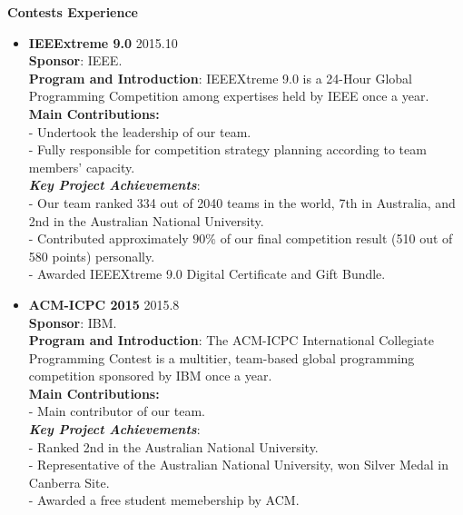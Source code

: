 \documentclass{res}
\newcommand{\resheading}[1]{{\normalsize \colorbox{mygrey}{\begin{minipage}{\textwidth}{\textbf{#1 \vphantom{p\^{E}}}}\end{minipage}}}}
\begin{document}
\begin{resume}
\begin{CJK*}{UTF8}{song}
\resheading{Contests Experience}

\begin{itemize}

\itemsep -2pt %
  \item{\bf IEEExtreme 9.0} \hfill 2015.10 \vspace{3pt} \\
		\textbf{Sponsor}: IEEE. \vspace{3pt} \\
		\textbf{Program and Introduction}: IEEEXtreme 9.0 is a 24-Hour Global Programming Competition among expertises held by IEEE once a year. \vspace{3pt} \\
		\textbf{Main Contributions:} \vspace{3pt} \\
		- Undertook the leadership of our team. \\
		- Fully responsible for competition strategy planning according to team members' capacity. \vspace{3pt} \\		
		\textit{\textbf{Key Project Achievements}}: \vspace{3pt} \\
		- Our team ranked 334 out of 2040 teams in the world, 7th in Australia, and 2nd in the Australian National University. \\
		- Contributed approximately $90\%$ of our final competition result (510 out of 580 points) personally. \\
		- Awarded IEEEXtreme 9.0 Digital Certificate and Gift Bundle. \\
        
  \item{\bf ACM-ICPC 2015} \hfill 2015.8 \vspace{3pt} \\
  		\textbf{Sponsor}: IBM. \vspace{3pt} \\
		\textbf{Program and Introduction}: The ACM-ICPC International Collegiate Programming Contest is a multitier, team-based global programming competition sponsored by IBM once a year. \vspace{3pt} \\
		\textbf{Main Contributions:} \vspace{3pt} \\
		- Main contributor of our team. \vspace{3pt} \\
		\textit{\textbf{Key Project Achievements}}: \vspace{3pt} \\
		- Ranked 2nd in the Australian National University. \\
		- Representative of the Australian National University, won Silver Medal in Canberra Site. \\
		- Awarded a free student memebership by ACM.
			

\end{itemize}
\end{CJK*}
\end{resume}
\end{document}
